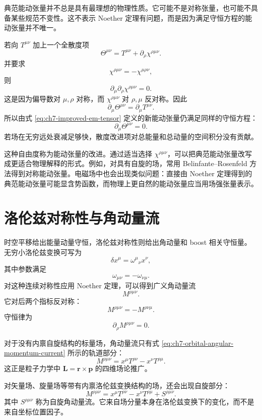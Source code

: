典范能动张量并不总是具有最理想的物理性质。它可能不是对称张量，也可能不具备某些规范不变性。这不表示 Noether 定理有问题，而是因为满足守恒方程的能动张量并不唯一。

若向 $T^{\mu\nu}$ 加上一个全散度项
\begin{equation}
	\Theta^{\mu\nu}=T^{\mu\nu}+\partial_{\rho}\chi^{\rho\mu\nu}.
	\label{eq:ch7-improved-em-tensor}
\end{equation}
并要求
\[
\chi^{\rho\mu\nu}=-\chi^{\mu\rho\nu},
\]
则
\[
\partial_{\mu}\partial_{\rho}\chi^{\rho\mu\nu}=0.
\]
这是因为偏导数对 $\mu,\rho$ 对称，而 $\chi^{\rho\mu\nu}$ 对 $\rho,\mu$ 反对称。因此
\[
\partial_{\mu}\Theta^{\mu\nu}
=
\partial_{\mu}T^{\mu\nu}.
\]
所以由式 \eqref{eq:ch7-improved-em-tensor} 定义的新能动张量仍满足同样的守恒方程：
\[
\partial_{\mu}\Theta^{\mu\nu}=0.
\]
若场在无穷远处衰减足够快，散度改进项对总能量和总动量的空间积分没有贡献。

这种自由度称为能动张量的改进。通过适当选择 $\chi^{\rho\mu\nu}$，可以把典范能动张量改写成更适合物理解释的形式。例如，对具有自旋的场，常用 Belinfante--Rosenfeld 方法得到对称能动张量。电磁场中也会出现类似问题：直接由 Noether 定理得到的典范能动张量可能显含势函数，而物理上更自然的能动张量应当用场强张量表示。

\section{洛伦兹对称性与角动量流}

时空平移给出能量动量守恒，洛伦兹对称性则给出角动量和 boost 相关守恒量。无穷小洛伦兹变换可写为
\[
\delta x^{\mu}=\omega^{\mu}{}_{\nu}x^{\nu},
\]
其中参数满足
\[
\omega_{\mu\nu}=-\omega_{\nu\mu}.
\]
对这种连续对称性应用 Noether 定理，可以得到广义角动量流
\[
M^{\rho\mu\nu}.
\]
它对后两个指标反对称：
\[
M^{\rho\mu\nu}=-M^{\rho\nu\mu}.
\]
守恒律为
\begin{equation}
	\partial_{\rho}M^{\rho\mu\nu}=0.
	\label{eq:ch7-angular-current-conservation}
\end{equation}

对于没有内禀自旋结构的标量场，角动量流只有式 \eqref{eq:ch7-orbital-angular-momentum-current} 所示的轨道部分：
\begin{equation}
	M^{\rho\mu\nu}
	=
	x^{\mu}T^{\rho\nu}-x^{\nu}T^{\rho\mu}.
	\label{eq:ch7-orbital-angular-momentum-current}
\end{equation}
这正是粒子力学中 $\bm{L}=\bm{r}\times\bm{p}$ 的四维场论推广。

对矢量场、旋量场等带有内禀洛伦兹变换结构的场，还会出现自旋部分：
\[
M^{\rho\mu\nu}
=
x^{\mu}T^{\rho\nu}
-
x^{\nu}T^{\rho\mu}
+
S^{\rho\mu\nu}.
\]
其中 $S^{\rho\mu\nu}$ 称为自旋角动量流。它来自场分量本身在洛伦兹变换下的变化，而不是来自坐标位置因子。

